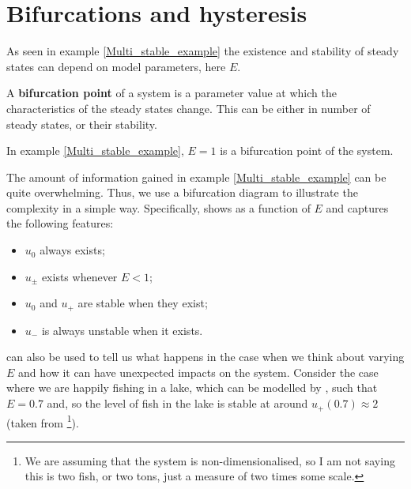 \section{Bifurcations and hysteresis}\label{Hysteresis}
As seen in example \ref{Multi_stable_example} the existence and stability of steady states can depend on model parameters, here $E$.
\begin{defin}
A \textbf{bifurcation point} of a system is a parameter value at which the characteristics of the steady states change. This can be either in number of steady states, or their stability.
\end{defin}
In example \ref{Multi_stable_example}, $E=1$ is a bifurcation point of the system.

The amount of information gained in example \ref{Multi_stable_example} can be quite overwhelming. Thus, we use a bifurcation diagram to illustrate the complexity in a simple way. Specifically,  shows  as a function of $E$ and captures the following features:
\begin{itemize}
\item $u_0$ always exists;
\item $u_\pm$ exists whenever $E<1$;
\item $u_0$ and $u_+$ are stable when they exist;
\item $u_-$ is always unstable when it exists.
\end{itemize}

 can also be used to tell us what happens in the case when we think about varying $E$ and how it can have unexpected impacts on the system. Consider the case where we are happily fishing in a lake, which can be modelled by , such that $E=0.7$ and, so the level of fish in the lake is stable at around $u_+(0.7)\approx 2$ (taken from \footnote{We are assuming that the system is non-dimensionalised, so I am not saying this is two fish, or two tons, just a measure of two times some scale.}).

